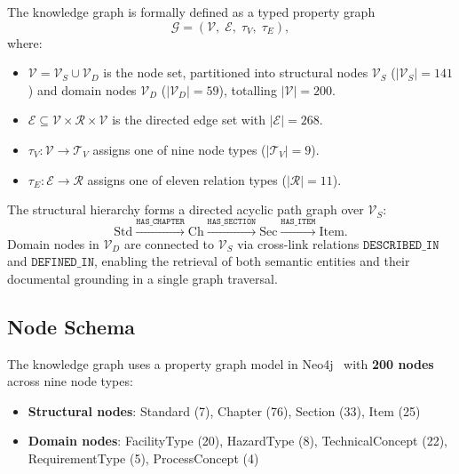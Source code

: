 \documentclass[twocolumn]{article}
\begin{document}
The knowledge graph is formally defined as a typed property graph
\begin{equation}
  \mathcal{G} = (\mathcal{V},\; \mathcal{E},\; \tau_V,\; \tau_E),
  \label{eq:kg}
\end{equation}
where:
\begin{itemize}
  \item $\mathcal{V} = \mathcal{V}_S \cup \mathcal{V}_D$ is the node set,
        partitioned into structural nodes $\mathcal{V}_S$ ($|\mathcal{V}_S|=141$)
        and domain nodes $\mathcal{V}_D$ ($|\mathcal{V}_D|=59$), totalling
        $|\mathcal{V}|=200$.
  \item $\mathcal{E} \subseteq \mathcal{V}\times\mathcal{R}\times\mathcal{V}$
        is the directed edge set with $|\mathcal{E}|=268$.
  \item $\tau_V : \mathcal{V} \to \mathcal{T}_V$ assigns one of nine node types
        ($|\mathcal{T}_V|=9$).
  \item $\tau_E : \mathcal{E} \to \mathcal{R}$ assigns one of eleven relation types
        ($|\mathcal{R}|=11$).
\end{itemize}

The structural hierarchy forms a directed acyclic path graph over $\mathcal{V}_S$:
\begin{equation}
  \mathrm{Std}
  \xrightarrow{\texttt{HAS\_CHAPTER}}
  \mathrm{Ch}
  \xrightarrow{\texttt{HAS\_SECTION}}
  \mathrm{Sec}
  \xrightarrow{\texttt{HAS\_ITEM}}
  \mathrm{Item}.
  \label{eq:hierarchy}
\end{equation}
Domain nodes in $\mathcal{V}_D$ are connected to $\mathcal{V}_S$ via cross-link relations
$\texttt{DESCRIBED\_IN}$ and $\texttt{DEFINED\_IN}$, enabling
the retrieval of both semantic entities and their documental grounding in a single graph traversal.

\subsection{Node Schema}

The knowledge graph uses a property graph model in Neo4j~\cite{neo4j2024} with
\textbf{200 nodes} across nine node types:

\begin{itemize}
  \item \textbf{Structural nodes}: Standard (7), Chapter (76), Section (33), Item (25)
  \item \textbf{Domain nodes}: FacilityType (20), HazardType (8), TechnicalConcept (22),
        RequirementType (5), ProcessConcept (4)
\end{itemize}
\end{document}
